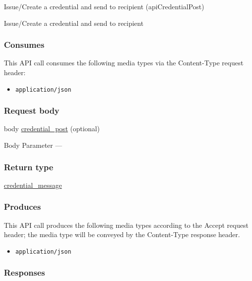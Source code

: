 Issue/Create a credential and send to recipient ({apiCredentialPost})

Issue/Create a credential and send to recipient

\hypertarget{consumes-19}{%
\subsubsection{Consumes}\label{consumes-19}}

This API call consumes the following media types via the {Content-Type}
request header:

\begin{itemize}
\tightlist
\item
  \texttt{application/json}
\end{itemize}

\hypertarget{request-body-19}{%
\subsubsection{Request body}\label{request-body-19}}

body \protect\hyperlink{credential_post}{credential\_post} (optional)

{Body Parameter} ---

\hypertarget{return-type-48}{%
\subsubsection{Return type}\label{return-type-48}}

\protect\hyperlink{credential_message}{credential\_message}

\hypertarget{produces-60}{%
\subsubsection{Produces}\label{produces-60}}

This API call produces the following media types according to the
{Accept} request header; the media type will be conveyed by the
{Content-Type} response header.

\begin{itemize}
\tightlist
\item
  \texttt{application/json}
\end{itemize}

\hypertarget{responses-60}{%
\subsubsection{Responses}\label{responses-60}}

